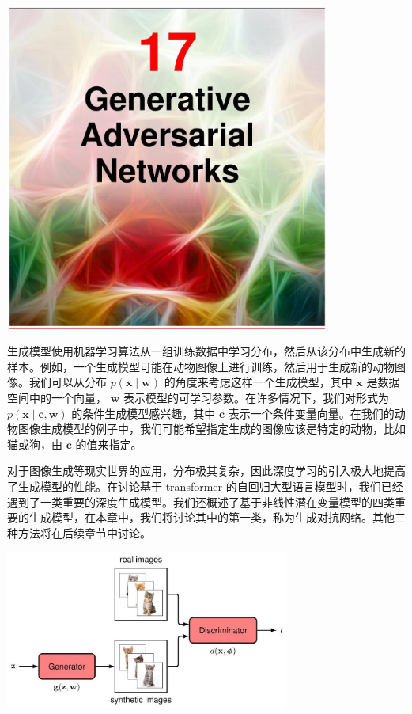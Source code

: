 \documentclass[10pt]{article}
\begin{document}
\begin{center}
\includegraphics[max width=0.8\textwidth]{images/0194e279-9b28-703a-88f4-c3ac21e2010d_552_474_351_1074_1085_0.jpg}
\end{center}
\hspace*{3em} 

生成模型使用机器学习算法从一组训练数据中学习分布，然后从该分布中生成新的样本。例如，一个生成模型可能在动物图像上进行训练，然后用于生成新的动物图像。我们可以从分布 \(p\left( {\mathbf{x} \mid  \mathbf{w}}\right)\) 的角度来考虑这样一个生成模型，其中 \(\mathbf{x}\) 是数据空间中的一个向量， \(\mathbf{w}\) 表示模型的可学习参数。在许多情况下，我们对形式为 \(p\left( {\mathbf{x} \mid  \mathbf{c},\mathbf{w}}\right)\) 的条件生成模型感兴趣，其中 \(\mathbf{c}\) 表示一个条件变量向量。在我们的动物图像生成模型的例子中，我们可能希望指定生成的图像应该是特定的动物，比如猫或狗，由 \(\mathbf{c}\) 的值来指定。

对于图像生成等现实世界的应用，分布极其复杂，因此深度学习的引入极大地提高了生成模型的性能。在讨论基于 transformer 的自回归大型语言模型时，我们已经遇到了一类重要的深度生成模型。我们还概述了基于非线性潜在变量模型的四类重要的生成模型，在本章中，我们将讨论其中的第一类，称为生成对抗网络。其他三种方法将在后续章节中讨论。

\begin{center}
\includegraphics[max width=0.7\textwidth]{images/0194e279-9b28-703a-88f4-c3ac21e2010d_553_547_353_921_513_0.jpg}
\end{center}
\hspace*{3em} 
\end{document}
